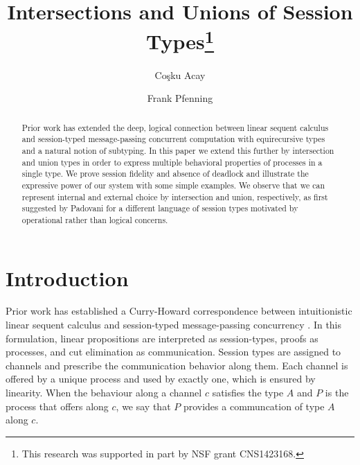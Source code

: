 \documentclass[a4paper,USenglish]{lipics-v2016}
\title{Intersections and Unions of Session Types\footnote{This research was supported in part by NSF grant CNS1423168.}}
\author[1]{Co\c{s}ku Acay}
\author[2]{Frank Pfenning}
\affil[1]{Carnegie Mellon University, Pittsburgh, PA 15213 \\
  \texttt{cacay@cmu.edu}}
\affil[2]{Carnegie Mellon University, Pittsburgh, PA 15213 \\
  \texttt{fp@cs.cmu.edu}}
\begin{document}
\maketitle

\begin{abstract}
  Prior work has extended the deep, logical connection between linear
  sequent calculus and session-typed message-passing concurrent
  computation with equirecursive types and a natural notion of
  subtyping. In this paper we extend this further by intersection and
  union types in order to express multiple behavioral properties of
  processes in a single type. We prove session fidelity and absence of
  deadlock and illustrate the expressive power of our system with some
  simple examples. We observe that we can represent internal and
  external choice by intersection and union, respectively, as first
  suggested by Padovani for a different language of session types
  motivated by operational rather than logical concerns.
\end{abstract}



\section{Introduction}

Prior work has established a Curry-Howard correspondence between intuitionistic linear sequent calculus and session-typed message-passing concurrency \cite{CairesP10, PfenningG15, Honda93}. In this formulation, linear propositions are interpreted as session-types, proofs as processes, and cut elimination as communication. Session types are assigned to channels and prescribe the communication behavior along them. Each channel is offered by a unique process and used by exactly one, which is ensured by linearity. When the behaviour along a channel $c$ satisfies the type $A$ and $P$ is the process that offers along $c$, we say that $P$ provides a communcation of type $A$ along $c$.
\end{document}
